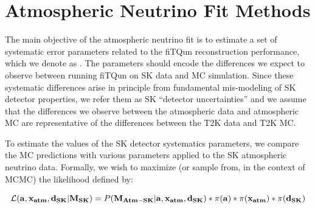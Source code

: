 


\section{Atmospheric Neutrino Fit Methods}
\label{sec:methods}

The main objective of the atmospheric neutrino fit is to estimate a set of
systematic error parameters related to the fiTQun reconstruction performance,
which we denote as \ldsk.  The \ldsk parameters should encode the differences 
we expect to observe between running fiTQun on SK data and MC simulation.
Since these systematic differences arise in principle from fundamental mis-modeling of SK detector properties,
we refer them as SK ``detector uncertainties'' and we assume that the differences we observe
between the atmospheric data and atmospheric MC are representative of the differences between the
T2K data and T2K MC. 

To estimate the values of the SK detector systematics parameters, we compare
the MC predictions with various \ldsk parameters applied to the SK atmospheric
neutrino data. Formally, we wish to maximize (or sample from, in the context of
MCMC) the likelihood defined by:

\begin{equation}
  \label{eq:likelihood}
  \mathcal{L}(\mathbf{a},\mathbf{x_{atm}},\mathbf{d_{SK}}|\mathbf{M_{SK}}) =
  P(\mathbf{M_{Atm-SK}}|\mathbf{a},\mathbf{x_{atm}},\mathbf{d_{SK}}) \ast \pi(\mathbf{a})
  \ast \pi(\mathbf{x_{atm}}) \ast \pi(\mathbf{d_{SK}})
\end{equation}

